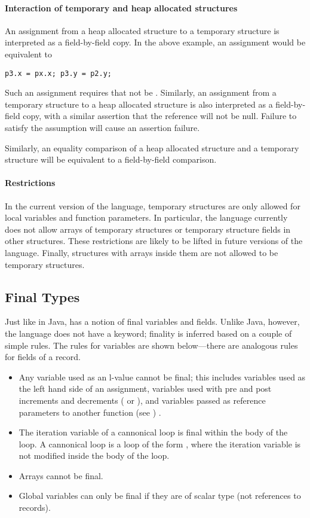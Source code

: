 \paragraph{Interaction of temporary and heap allocated structures}
An assignment from a heap allocated structure to a temporary structure is interpreted as a field-by-field copy. In the above example, an assignment  would be equivalent to
\begin{lstlisting}
p3.x = px.x; p3.y = p2.y;
\end{lstlisting}
Such an assignment requires that  not be . Similarly, an assignment from a temporary structure to a heap allocated structure is also interpreted as a field-by-field copy, with a similar assertion that the reference will not be null. Failure to satisfy the assumption will cause an assertion failure.

Similarly, an equality comparison of a heap allocated structure and a temporary structure will be equivalent to a field-by-field comparison.

\paragraph{Restrictions}
In the current version of the language, temporary structures are only allowed for local variables and function parameters. In particular, the language currently does not allow arrays of temporary structures or temporary structure fields in other structures. These restrictions are likely to be lifted in future versions of the language. Finally, structures with arrays inside them are not allowed to be temporary structures.




\subsection{Final Types}
Just like in Java, \Sk{} has a notion of final variables and fields. Unlike Java, however, the language does not have a  keyword; finality is inferred based on a couple of simple rules. The rules for variables are shown below---there are analogous rules for fields of a record.

\begin{itemize}
\item Any variable used as an l-value cannot be final; this includes variables used as the left hand side of an assignment, variables used with pre and post increments and decrements ( or ), and variables passed as reference parameters to another function (see ) .

\item The iteration variable of a cannonical  loop is final within the body of the loop. A cannonical  loop is a loop of the form , where the iteration variable is not modified inside the body of the loop.

\item Arrays cannot be final.
\item Global variables can only be final if they are of scalar type (not references to records).
\end{itemize}

